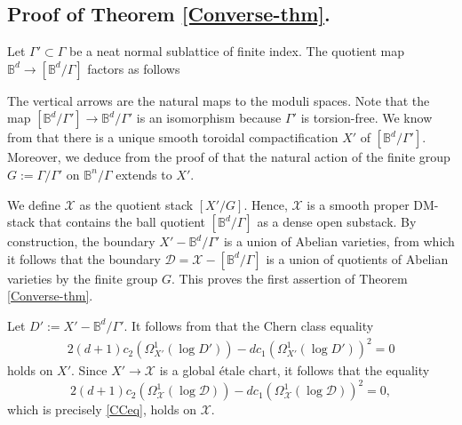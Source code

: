 \documentclass[a4paper]{amsart}
\theoremstyle{definition}
\begin{document}
\subsection{Proof of Theorem \ref{Converse-thm}.}
Let $\Gamma'\subset\Gamma$ be a neat normal sublattice of finite index. The quotient map $\mathbb{B}^d\to[\mathbb{B}^d/\Gamma]$ factors as follows
\begin{center}
\end{center}
The vertical arrows are the natural maps to the moduli spaces. Note that the map $[\mathbb{B}^d/\Gamma']\to\mathbb{B}^d/\Gamma'$ is an isomorphism because $\Gamma'$ is torsion-free. We know from \cite[Theorem 5.2]{AMRT10} that there is a unique smooth toroidal compactification $X'$ of $[\mathbb{B}^d/\Gamma']$. Moreover, we deduce from the proof of \cite[Lemma A.2]{dengcadorel} that the natural action of the finite group $G:=\Gamma/\Gamma'$ on $\mathbb{B}^n/\Gamma$ extends to $X'$. 

We define $\mathscr{X}$ as the quotient stack $[X'/G]$. Hence, $\mathscr{X}$ is a smooth proper DM-stack that contains the ball quotient $[\mathbb{B}^d/\Gamma]$ as a dense open substack. By construction, the boundary $X'-\mathbb{B}^d/\Gamma'$ is a union of Abelian varieties, from which it follows that the boundary $\mathscr{D}=\mathscr{X}-[\mathbb{B}^d/\Gamma]$ is a union of quotients of Abelian varieties by the finite group $G$. This proves the first assertion of Theorem \ref{Converse-thm}.

Let $D':=X'-\mathbb{B}^d/\Gamma'$. It follows from \cite[Section 6.4]{dengcadorel} that the Chern class equality 
\begin{align*}
    2(d+1)c_2(\Omega^1_{X'}(\log D'))-dc_1(\Omega^1_{X'}(\log D'))^2=0
\end{align*}
holds on $X'$. Since $X'\to\mathscr{X}$ is a global \'etale chart, it follows that the equality 
\[
2(d+1)c_2(\Omega^1_{\mathscr{X}}(\log \mathscr{D}))-dc_1(\Omega^1_{\mathscr{X}}(\log \mathscr{D}))^2=0,
\]
which is precisely \ref{CCeq}, holds on $\mathscr{X}$. 
\end{document}
